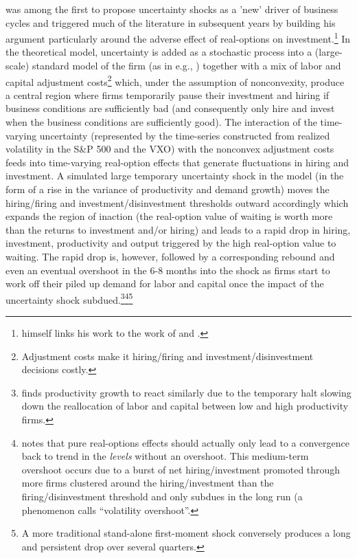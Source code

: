 \documentclass[a4paper,11pt,listof=nochaptergap,oneside,pointednumbers,bibtotoc,bigheadings,liststotoc,hidelinks]{scrbook}
\theoremstyle{mysatz}
\theoremstyle{mydefinition}
\theoremstyle{mytheorem}
\theoremstyle{mybemerkung}
\begin{document}
\citet{bloom:09} was among the first to propose uncertainty shocks as a 'new' driver of business cycles and triggered much of the literature in subsequent years by building his argument particularly around the adverse effect of real-options on investment.\footnote{\citet{bloom:09} himself links his work to the work of \citet{bernanke:83} and \citet{hassler:96}.} In the theoretical model, uncertainty is added as a stochastic process into a (large-scale) standard model of the firm (as in e.g., \citealp{abelandeberly:96}) together with a mix of labor and capital adjustment costs\footnote{Adjustment costs make it hiring/firing and investment/disinvestment decisions costly.} which, under the assumption of nonconvexity, produce a central region where firms temporarily pause their investment and hiring if business conditions are sufficiently bad (and consequently only hire and invest when the business conditions are sufficiently good). The interaction of the time-varying uncertainty (represented by the time-series constructed from realized volatility in the S\&P 500 and the VXO) with the nonconvex adjustment costs feeds into time-varying real-option effects that generate fluctuations in hiring and investment. A simulated large temporary uncertainty shock in the model (in the form of a rise in the variance of productivity and demand growth) moves the hiring/firing and investment/disinvestment thresholds outward accordingly which expands the region of inaction (the real-option value of waiting is worth more than the returns to investment and/or hiring) and leads to a rapid drop in hiring, investment, productivity and output triggered by the high real-option value to waiting. The rapid drop is, however, followed by a corresponding rebound and even an eventual overshoot in the 6-8 months into the shock as firms start to work off their piled up demand for labor and capital once the impact of the uncertainty shock subdued.\footnote{\citet{bloom:09} finds productivity growth to react similarly due to the temporary halt slowing down the reallocation of labor and capital between low and high productivity firms.}\footnote{\citet[p. 646]{bloom:09} notes that pure real-options effects should actually only lead to a convergence back to trend in the \textit{levels} without an overshoot. This medium-term overshoot occurs due to a burst of net hiring/investment promoted through more firms clustered around the hiring/investment than the firing/disinvestment threshold and only subdues in the long run (a phenomenon \citet{bloom:09} calls ``volatility overshoot''.}\footnote{A more traditional stand-alone first-moment shock conversely produces a long and persistent drop over several quarters.} 
\end{document}
